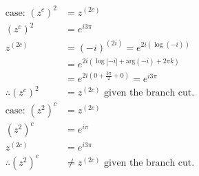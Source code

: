 \documentclass{article}
\begin{document}
\begin{align*}
  \text{case: } (z^c)^2 &= z^{(2c)} \\
  (z^c)^2 &= e^{i3\pi}\\
  z^{(2c)} &= (-i)^{(2i)} = e^{2i(\log{(-i)})}\\
  &= e^{2i(\log{|-i| + \text{arg}(-i) + 2\pi k})}\\
  &= e^{2i(0 + \frac{3\pi}{2} + 0)} = e^{i3\pi}\\
  \therefore (z^c)^2 &= z^{(2c)} \text{ given the branch cut.}
\end{align*}
\begin{align*}
  \text{case: } (z^2)^c &= z^{(2c)} \\
  (z^2)^c &= e^{i\pi}\\
  z^{(2c)} &= e^{i3\pi}\\
\therefore (z^2)^c &\neq z^{(2c)} \text{ given the branch cut.}  
\end{align*}
\end{document}
